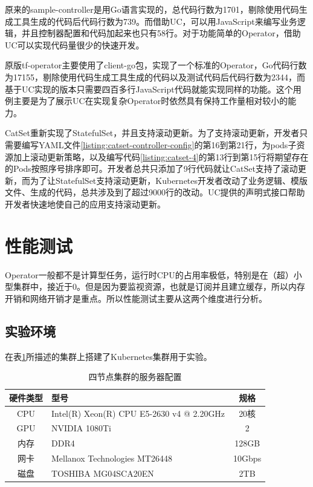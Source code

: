 \documentclass[macfonts,master]{njuthesis}
\begin{document}
原来的sample-controller是用Go语言实现的，总代码行数为1701，剔除使用代码生成工具生成的代码后代码行数为739。而借助UC，可以用JavaScript来编写业务逻辑，并且控制器配置和代码加起来也只有58行。对于功能简单的Operator，借助UC可以实现代码量很少的快速开发。

原版tf-operator主要使用了client-go包，实现了一个标准的Operator，Go代码行数为17155，剔除使用代码生成工具生成的代码以及测试代码后代码行数为2344，而基于UC实现的版本只需要四百多行JavaScript代码就能实现同样的功能。这个用例主要是为了展示UC在实现复杂Operator时依然具有保持工作量相对较小的能力。

CatSet重新实现了StatefulSet，并且支持滚动更新。为了支持滚动更新，开发者只需要编写YAML文件\ref{listing:catset-controller-config}的第16到第21行，为pods子资源加上滚动更新策略，以及编写代码\ref{listing:catset-4}的第13行到第15行将期望存在的Pods按照序号排序即可。开发者总共只添加了9行代码就让CatSet支持了滚动更新，而为了让StatefulSet支持滚动更新，Kubernetes开发者改动了业务逻辑、模版文件、生成的代码，总共涉及到了超过9000行的改动\cite{statefulsetupdate}。UC提供的声明式接口帮助开发者快速地使自己的应用支持滚动更新。

\section{性能测试}

Operator一般都不是计算型任务，运行时CPU的占用率极低，特别是在（超）小型集群中，接近于0。但是因为要监视资源，也就是订阅并且建立缓存，所以内存开销和网络开销才是重点。所以性能测试主要从这两个维度进行分析。

\subsection{实验环境}

在表\ref{table:test-env}所描述的集群上搭建了Kubernetes集群用于实验。
\begin{table}
  \centering
  \begin{tabular}{cp{60mm}c}
    \toprule
    \textbf{硬件类型} & \textbf{型号} & \textbf{规格} \\
    \midrule
    CPU  & Intel(R) Xeon(R) CPU E5-2630 v4 @ 2.20GHz  & 20核\\
    GPU  & NVIDIA 1080Ti   &  2 \\
    内存     & DDR4 & 128GB \\
    网卡    & Mellanox Technologies MT26448   & 10Gbps \\
    磁盘 & TOSHIBA MG04SCA20EN & 2TB \\
    \bottomrule
  \end{tabular}
  \caption{四节点集群的服务器配置}\label{table:test-env}
\end{table}
\end{document}
